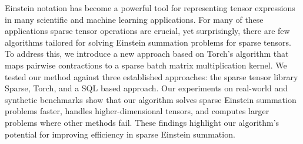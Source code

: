 Einstein notation has become a powerful tool for representing tensor expressions in many scientific and
machine learning applications. For many of these applications sparse tensor operations are crucial,
yet surprisingly, there are few algorithms tailored for solving Einstein summation problems for sparse tensors.
To address this, we introduce a new approach based on Torch's algorithm that maps pairwise contractions
to a sparse batch matrix multiplication kernel. We tested our method against three established approaches:
the sparse tensor library Sparse, Torch, and a SQL based approach. Our experiments on real-world and
synthetic benchmarks show that our algorithm solves sparse Einstein summation problems faster, handles
higher-dimensional tensors, and computes larger problems where other methods fail. These findings highlight
our algorithm's potential for improving efficiency in sparse Einstein summation.
